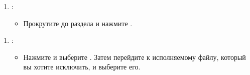 \documentclass[letterpaper,10pt,russian]{sphinxmanual}
\begin{document}
\begin{figure}[htbp]
\centering

\noindent{}
\end{figure}
\begin{enumerate}
%
\setcounter{enumi}{3}
\item {} 
\sphinxAtStartPar
{}:
\begin{itemize}
\item {} 
\sphinxAtStartPar
Прокрутите до раздела  и нажмите .

\end{itemize}

\end{enumerate}

\begin{figure}[htbp]
\centering

\noindent{}
\end{figure}
\begin{enumerate}
%
\setcounter{enumi}{4}
\item {} 
\sphinxAtStartPar
{}:
\begin{itemize}
\item {} 
\sphinxAtStartPar
Нажмите  и выберите . Затем перейдите к исполняемому файлу, который вы хотите исключить, и выберите его.

\end{itemize}

\end{enumerate}

\begin{figure}[htbp]
\centering

\noindent{}
\end{figure}

\begin{figure}[htbp]
\centering

\noindent{}
\end{figure}

\begin{figure}[htbp]
\centering

\noindent{}
\end{figure}
\end{document}
